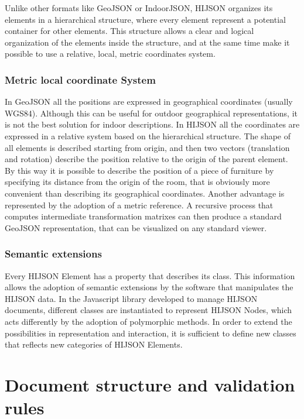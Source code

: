 \documentclass{sig-alternate}
\begin{document}
Unlike other formats like GeoJSON or IndoorJSON, HIJSON organizes its
elements in a hierarchical structure, where every element represent a
potential container for other elements. This structure allows a clear
and logical organization of the elements inside the structure, and at
the same time make it possible to use a relative, local, metric
coordinates system.

\subsubsection{Metric local coordinate System}\label{metric-local-coordinate-system}

In GeoJSON all the positions are expressed in geographical coordinates
(usually WGS84). Although this can be useful for outdoor geographical
representations, it is not the best solution for indoor descriptions. In
HIJSON all the coordinates are expressed in a relative system based on
the hierarchical structure. The shape of all elements is described
starting from origin, and then two vectors (translation and rotation)
describe the position relative to the origin of the parent element. By
this way it is possible to describe the position of a piece of furniture
by specifying its distance from the origin of the room, that is
obviously more convenient than describing its geographical coordinates.
Another advantage is represented by the adoption of a metric reference.
A recursive process that computes intermediate transformation matrixes
can then produce a standard GeoJSON representation, that can be
visualized on any standard viewer.

\subsubsection{Semantic extensions}\label{semantic-extensions}

Every HIJSON Element has a property that describes its class. This
information allows the adoption of semantic extensions by the software
that manipulates the HIJSON data. In the Javascript library developed to
manage HIJSON documents, different classes are instantiated to represent
HIJSON Nodes, which acts differently by the adoption of polymorphic
methods. In order to extend the possibilities in representation and
interaction, it is sufficient to define new classes that reflects new
categories of HIJSON Elements.

\section{Document structure and validation rules}\label{document-structure-and-validation-rules}
\end{document}
